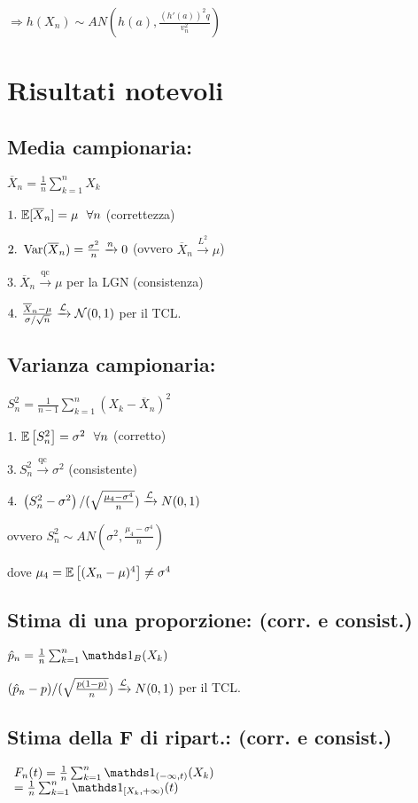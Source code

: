 $\Rightarrow h( X_n) \sim AN\left( h(a),\frac{( h'(a))^2 q}{v^2_n}\right)$
\section{Risultati notevoli}
\subsection{Media campionaria:}

$\overline{X}_n =\frac{1}{n}\sum^n_{k=1} X_k$

$1.\ \mathbb E[\overline{X}_n] =\mu \ \ \forall n$ (correttezza)

$2.\ \operatorname{Var}(\overline{X}_n) =\frac{\sigma^2}{n}\xrightarrow{n} 0$ (ovvero $\overline{X}_n\xrightarrow{L^2} \mu $)

$3.\ \overline{X}_n\xrightarrow{\text{qc}} \mu $ per la LGN (consistenza)

$4.\ \frac{\overline{X}_n -\mu}{\sigma /\sqrt{n}}\xrightarrow{\mathcal L}\mathcal N (0,1)$ per il TCL.
\subsection{Varianza campionaria:}

$S^2_n =\frac{1}{n-1}\sum^n_{k=1}( X_k -\overline{X}_n)^2$

$1.\ \EE\left[ S^2_n\right] =\sigma^2 \ \ \forall n$ (corretto)

$3.\ S^2_n\xrightarrow{\text{qc}} \sigma^2$ (consistente)

$4.\ \left( S^2_n -\sigma^2\right) /(\sqrt{\frac{\mu_4 -\sigma^4}{n}} )\xrightarrow{\mathcal L} N (0,1)$

ovvero $S^2_n \sim AN\left( \sigma^2 ,\frac{\mu_4 -\sigma^4}{n}\right)$

dove $\mu_4 =\mathbb E\left[( X_n -\mu )^4\right] \neq \sigma^4$
\subsection{Stima di una proporzione: (corr. e consist.)}

$\hat{p}_n =\frac{1}{n}\sum^n_{k=1}\Ind_B( X_k)$

$(\hat{p}_n -p) /(\sqrt{\frac{p(1-p)}{n}} )\xrightarrow{\mathcal L} N (0,1)$ per il TCL.
\subsection{Stima della F di ripart.: (corr. e consist.)}

$ \begin{array}{l}
F_n (t)=\frac{1}{n}\sum^n_{k=1}\Ind_{(-\infty ,t)}( X_k)\\
=\frac{1}{n}\sum^n_{k=1}\Ind_{[ X_k ,+\infty )} (t)
\end{array}$

